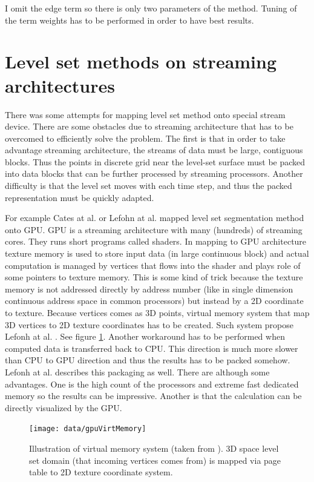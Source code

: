 I omit the edge term so there is only two parameters of the method.
Tuning of the term weights has to be performed in order to have best results.

\section{Level set methods on streaming architectures}

\par
There was some attempts for mapping level set method onto special stream device.
There are some obstacles due to streaming architecture that has to be overcomed to efficiently solve the problem.
The first is that in order to take advantage streaming architecture, the streams of data must be large, contiguous blocks.
Thus the points in discrete grid near the level-set surface must be packed into data blocks that can be further processed by streaming processors.
Another difficulty is that the level set moves with each time step, and thus the packed representation must be quickly adapted.

\par
For example Cates at al. \cite{GIST} or Lefohn at al. \cite{lefonhGPUSolver} mapped level set segmentation method onto GPU.
GPU is a streaming architecture with many (hundreds) of streaming cores. They runs short programs called shaders.
In mapping to GPU architecture texture memory is used to store input data (in large continuous block) and actual computation is managed by vertices that flows into the shader and plays role of some pointers to texture memory.
This is some kind of trick because the texture memory is not addressed directly by address number (like in single dimension continuous address space in common processors) but instead by a 2D coordinate to texture.
Because vertices comes as 3D points, virtual memory system that map 3D vertices to 2D texture coordinates has to be created.
Such system propose Lefonh at al. \cite{lefonhGPUSolver}. See figure \ref{fg:virtual memory on GPU}.
Another workaround has to be performed when computed data is transferred back to CPU.
This direction is much more slower than CPU to GPU direction and thus the results has to be packed somehow.
Lefonh at al. \cite{lefonhGPUSolver} describes this packaging as well.
There are although some advantages.
One is the high count of the processors and extreme fast dedicated memory so the results can be impressive.
Another is that the calculation can be directly visualized by the GPU.

\begin{figure}
    \centering
    \texttt{[image: data/gpuVirtMemory]}
    \caption[GPU virtual memory]{Illustration of virtual memory system (taken from \cite{lefonhGPUSolver}). 3D space level set domain (that incoming vertices comes from) is mapped via page table to 2D texture coordinate system.}
    \label{fg:virtual memory on GPU}
\end{figure}

